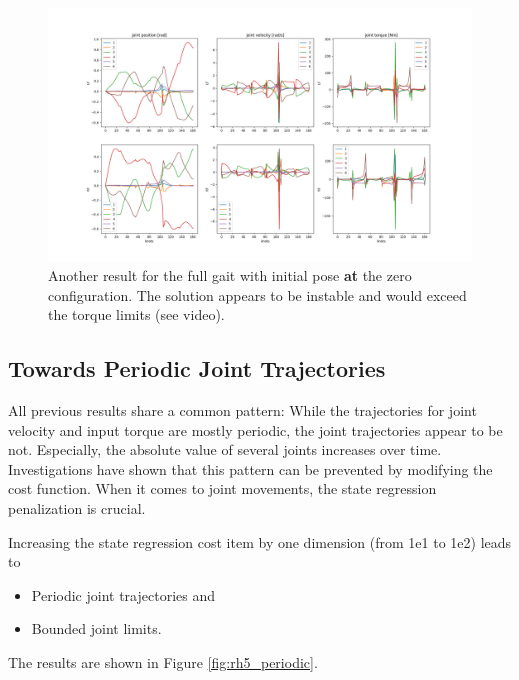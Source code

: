 \begin{figure}[h!]
\centering
\includegraphics[width=1\linewidth]{Media/Crocoddyl/RH5Legs/InitPoseVariants/RH5GaitInitZeroConfig_Solution_FailedSolver.png}
\caption{Another result for the full gait with initial pose \textbf{at} the zero configuration. The solution appears to be instable and would exceed the torque limits (see video).}
\label{fig:rh5_init_at_zero_failed_solver}
\end{figure}

\subsection{Towards Periodic Joint Trajectories}
All previous results share a common pattern: While the trajectories for joint velocity and input torque are mostly periodic, the joint trajectories appear to be not. Especially, the absolute value of several joints increases over time. Investigations have shown that this pattern can be prevented by modifying the cost function. When it comes to joint movements, the state regression penalization is crucial. 

Increasing the state regression cost item by one dimension (from 1e1 to 1e2) leads to
\begin{itemize}
\item Periodic joint trajectories and
\item Bounded joint limits. 
\end{itemize} 
The results are shown in Figure \ref{fig:rh5_periodic}.
   
